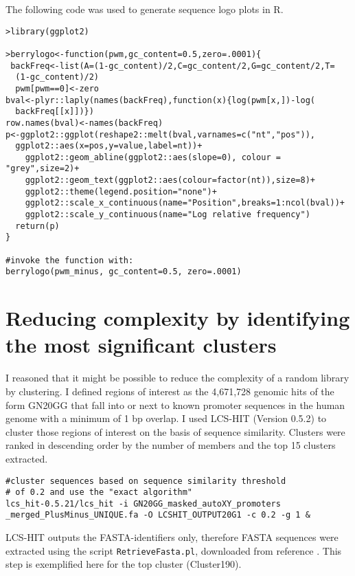 The following code  was used to generate sequence logo plots \cite{Berry:2006hv} in R.

\begin{small}\begin{lstlisting}
>library(ggplot2) 

>berrylogo<-function(pwm,gc_content=0.5,zero=.0001){
 backFreq<-list(A=(1-gc_content)/2,C=gc_content/2,G=gc_content/2,T=
  (1-gc_content)/2)
  pwm[pwm==0]<-zero
bval<-plyr::laply(names(backFreq),function(x){log(pwm[x,])-log(
  backFreq[[x]])})
row.names(bval)<-names(backFreq)
p<-ggplot2::ggplot(reshape2::melt(bval,varnames=c("nt","pos")),
  ggplot2::aes(x=pos,y=value,label=nt))+
    ggplot2::geom_abline(ggplot2::aes(slope=0), colour = "grey",size=2)+
    ggplot2::geom_text(ggplot2::aes(colour=factor(nt)),size=8)+
    ggplot2::theme(legend.position="none")+
    ggplot2::scale_x_continuous(name="Position",breaks=1:ncol(bval))+
    ggplot2::scale_y_continuous(name="Log relative frequency")
  return(p)
}

#invoke the function with:
berrylogo(pwm_minus, gc_content=0.5, zero=.0001)
\end{lstlisting}\end{small}

\section{Reducing complexity by identifying the most significant clusters}

I reasoned that it might be possible to reduce the complexity of a random library by clustering. I defined regions of interest as the 4,671,728 genomic hits of the form GN20GG that fall into or next to known promoter sequences in the human genome with a minimum of 1 bp overlap. I used LCS-HIT (Version 0.5.2) \cite{Namiki:2013bv} to cluster those regions of interest on the basis of sequence similarity. Clusters were ranked in descending order by the number of members and the top 15 clusters extracted.

\begin{small}\begin{lstlisting}
#cluster sequences based on sequence similarity threshold
# of 0.2 and use the "exact algorithm"
lcs_hit-0.5.21/lcs_hit -i GN20GG_masked_autoXY_promoters
_merged_PlusMinus_UNIQUE.fa -O LCSHIT_OUTPUT20G1 -c 0.2 -g 1 & 
\end{lstlisting}\end{small}

LCS-HIT outputs the FASTA-identifiers only, therefore FASTA sequences were extracted using the script  \verb|RetrieveFasta.pl|, downloaded from reference \cite{Retrieve:Online}. This step is exemplified here  for the top cluster (Cluster190).

